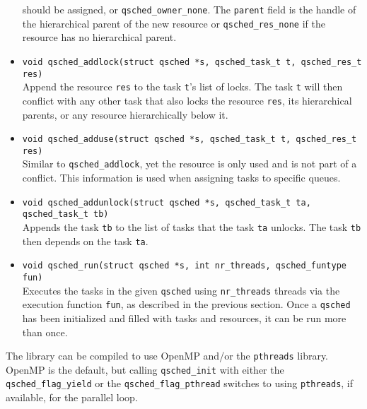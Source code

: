 \documentclass[fleqn,10pt]{wlpeerj}
\begin{document}
\begin{itemize}
        should be assigned, or {\tt qsched\_owner\_none}.
        The {\tt parent} field is the handle of the hierarchical parent of
        the new resource or {\tt qsched\_res\_none} if the resource
        has no hierarchical parent.
        \vspace{1mm}
    \item {\tt void qsched\_addlock(struct qsched *s, qsched\_task\_t t, qsched\_res\_t res)} \\
        Append the resource {\tt res} to the task {\tt t}'s list of
        locks.
        The task {\tt t} will then conflict with any other task that
        also locks the resource {\tt res}, its hierarchical parents, or
        any resource hierarchically below it.
        \vspace{1mm}
    \item {\tt void qsched\_adduse(struct qsched *s, qsched\_task\_t t, qsched\_res\_t res)} \\
        Similar to {\tt qsched\_addlock}, yet the resource is only used and
        is not part of a conflict.
        This information is used when assigning tasks to specific queues.
        \vspace{1mm}
    \item {\tt void qsched\_addunlock(struct qsched *s, qsched\_task\_t ta, qsched\_task\_t tb)} \\
        Appends the task {\tt tb} to the list of tasks that the task {\tt ta}
        unlocks.
        The task {\tt tb} then depends on the task {\tt ta}.
        \vspace{1mm}
    \item {\tt void qsched\_run(struct qsched *s, int nr\_threads, qsched\_funtype fun)} \\
        Executes the tasks in the given {\tt qsched} using {\tt nr\_threads}
        threads via the execution function {\tt fun}, as described in the
        previous section.
        Once a {\tt qsched} has been initialized and filled with
        tasks and resources, it can be run more than once.
        \vspace{1mm}
\end{itemize}

The library can be compiled to use OpenMP and/or the
{\tt pthreads} library.
OpenMP is the default, but calling {\tt qsched\_init} with
either the {\tt qsched\_flag\_yield}
or the {\tt qsched\_flag\_pthread} switches to using {\tt pthreads},
if available, for the parallel loop.
\end{document}
